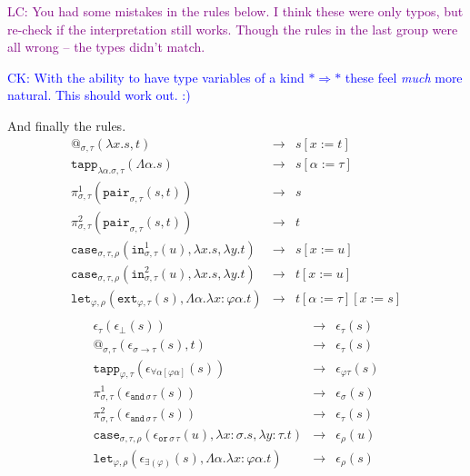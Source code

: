 \documentclass[runningheads,a4paper]{llncs}
\newcommand{\quant}[2]{\forall #1[#2]}
\newcommand{\red}{\longrightarrow}
\newcommand{\arrtype}{\rightarrow}
\newcommand{\arrkind}{\Rightarrow}
\newcommand{\abs}[2]{\lambda #1.#2}
\newcommand{\tabs}[2]{\Lambda #1.#2}
\newcommand{\CK}[1]{\textcolor{blue}{CK: #1}}
\newcommand{\LC}[1]{\textcolor{purple}{LC: #1}}
\begin{document}
\LC{You had some mistakes in the rules below. I think these were only
  typos, but re-check if the interpretation still works. Though the
  rules in the last group were all wrong -- the types didn't match.}

\CK{With the ability to have type variables of a kind $* \arrkind *$
  these feel \emph{much} more natural.  This should work out. :)}

And finally the rules.
\[
\begin{array}{rcl}
@_{\sigma,\tau}(\abs{x}{s},t) & \red & s[x:=t] \\
\mathtt{tapp}_{\abs{\alpha}{\sigma},\tau}(\tabs{\alpha}{s}) & \red &
  s[\alpha:=\tau] \\
\pi^1_{\sigma,\tau}(\mathtt{pair}_{\sigma,\tau}(s,t)) & \red & s \\
\pi^2_{\sigma,\tau}(\mathtt{pair}_{\sigma,\tau}(s,t)) & \red & t \\
\mathtt{case}_{\sigma,\tau,\rho}(\mathtt{in}^1_{\sigma,\tau}(u),
  \abs{x}{s},\abs{y}{t}) & \red & s[x:=u] \\
\mathtt{case}_{\sigma,\tau,\rho}(\mathtt{in}^2_{\sigma,\tau}(u),
  \abs{x}{s},\abs{y}{t}) & \red & t[x:=u] \\
\mathtt{let}_{\varphi,\rho}(\mathtt{ext}_{\varphi,\tau}(s),\tabs{\alpha}{\abs{x:\varphi \alpha}{t}}) & \red & t[\alpha:=\tau][x:=s] \\
\end{array}
\]
\[
\begin{array}{rcl}
\epsilon_\tau(\epsilon_\bot(s)) & \red & \epsilon_\tau(s) \\
@_{\sigma,\tau}(\epsilon_{\sigma \arrtype \tau}(s),t) & \red &
  \epsilon_\tau(s) \\
\mathtt{tapp}_{\varphi,\tau}(
  \epsilon_{\quant{\alpha}{\varphi\alpha}}(s)) & \red &
  \epsilon_{\varphi\tau}(s) \\
\pi^1_{\sigma,\tau}(\epsilon_{\mathtt{and}\,\sigma\,\tau}(s)) & \red &
  \epsilon_\sigma(s) \\
\pi^2_{\sigma,\tau}(\epsilon_{\mathtt{and}\,\sigma\,\tau}(s)) & \red &
  \epsilon_\tau(s) \\
\mathtt{case}_{\sigma,\tau,\rho}(\epsilon_{\mathtt{or}\,\sigma\,\tau}(
  u),\abs{x:\sigma}{s},\abs{y:\tau}{t}) & \red & \epsilon_\rho(u) \\
\mathtt{let}_{\varphi,\rho}(\epsilon_{\exists(\varphi)}(s),\tabs{\alpha}{\abs{x:\varphi\alpha}{t}}) & \red &
  \epsilon_\rho(s) \\
\end{array}
\]
\end{document}
